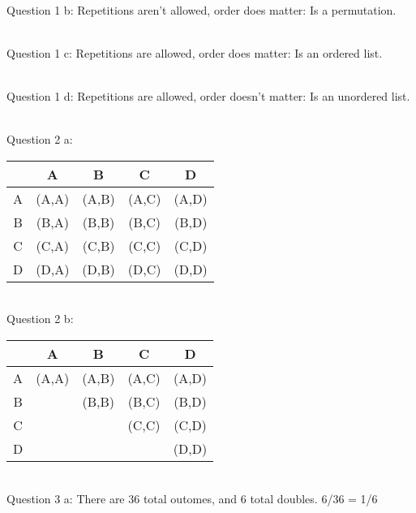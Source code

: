{    ~\\ Question 1 b:   Repetitions aren't allowed, order does matter: Is a permutation.

    ~\\ Question 1 c:   Repetitions are allowed, order does matter: Is an ordered list.

    ~\\ Question 1 d:   Repetitions are allowed, order doesn't matter: Is an unordered list.

    ~\\ Question 2 a:
                    \begin{center}
                        \begin{tabular}{c | c c c c}
                            & A & B & C & D \\ \hline
                            A & (A,A) & (A,B) & (A,C) & (A,D)
                            \\
                            B & (B,A) & (B,B) & (B,C) & (B,D)
                            \\
                            C & (C,A) & (C,B) & (C,C) & (C,D)
                            \\
                            D & (D,A) & (D,B) & (D,C) & (D,D)
                        \end{tabular}
                    \end{center}

    ~\\ Question 2 b:
                    \begin{center}
                        \begin{tabular}{c | c c c c}
                            & A & B & C & D \\ \hline
                            A & (A,A) & (A,B) & (A,C) & (A,D)
                            \\
                            B &  & (B,B) & (B,C) & (B,D)
                            \\
                            C &  &  & (C,C) & (C,D)
                            \\
                            D &  &  &  & (D,D)
                        \end{tabular}
                    \end{center}

    ~\\ Question 3 a:   There are 36 total outomes, and 6 total doubles. 6/36 = 1/6

}
